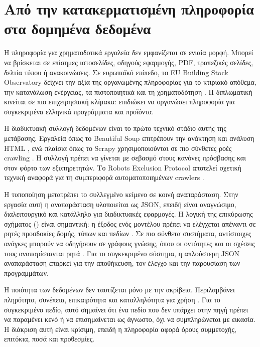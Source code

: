 \section{Από την κατακερματισμένη πληροφορία στα δομημένα δεδομένα}

Η πληροφορία για χρηματοδοτικά εργαλεία δεν εμφανίζεται σε ενιαία μορφή.
Μπορεί να βρίσκεται σε επίσημες ιστοσελίδες, οδηγούς εφαρμογής, PDF,
τραπεζικές σελίδες, δελτία τύπου ή ανακοινώσεις. Σε ευρωπαϊκό επίπεδο, το EU
Building Stock Observatory δείχνει την αξία της οργανωμένης πληροφορίας για
το κτιριακό απόθεμα, την κατανάλωση ενέργειας, τα πιστοποιητικά και τη
χρηματοδότηση \cite{ec_bso_2026}. Η διπλωματική κινείται σε πιο επιχειρησιακή
κλίμακα: επιδιώκει να οργανώσει πληροφορία για συγκεκριμένα ελληνικά
προγράμματα και προϊόντα.

Η διαδικτυακή συλλογή δεδομένων είναι το πρώτο τεχνικό στάδιο αυτής της
μετάβασης. Εργαλεία όπως το Beautiful Soup επιτρέπουν την ανάκτηση και
ανάλυση HTML \cite{beautifulsoup_docs}, ενώ πλαίσια όπως το Scrapy
χρησιμοποιούνται σε πιο σύνθετες ροές crawling \cite{scrapy_docs}. Η συλλογή
πρέπει να γίνεται με σεβασμό στους κανόνες πρόσβασης και στον φόρτο των
εξυπηρετητών. Το Robots Exclusion Protocol αποτελεί σχετική τεχνική αναφορά για
τη συμπεριφορά αυτοματοποιημένων crawlers \cite{rfc9309_robots}.

Η τυποποίηση μετατρέπει το συλλεγμένο κείμενο σε κοινή αναπαράσταση. Στην
εργασία αυτή η αναπαράσταση υλοποιείται ως JSON, επειδή είναι αναγνώσιμο,
διαλειτουργικό και κατάλληλο για διαδικτυακές εφαρμογές. Η λογική της
επικύρωσης σχήματος () είναι σημαντική: η έξοδος ενός
μοντέλου πρέπει να ελέγχεται απέναντι σε ρητές προσδοκίες δομής, τύπων και
πεδίων \cite{json_schema_spec_2026}. Σε πιο
σύνθετα συστήματα, αντίστοιχες ανάγκες μπορούν να οδηγήσουν σε γράφους γνώσης,
όπου οι οντότητες και οι σχέσεις τους αναπαρίστανται ρητά
\cite{hogan2021knowledge}. Για το συγκεκριμένο σύστημα, η απλούστερη JSON
αναπαράσταση επαρκεί για την αποθήκευση, τον έλεγχο και την παρουσίαση των
προγραμμάτων.

Η ποιότητα των δεδομένων δεν ταυτίζεται μόνο με την ακρίβεια. Περιλαμβάνει
πληρότητα, συνέπεια, επικαιρότητα και καταλληλότητα για χρήση
\cite{wang1996dataquality,batini2009dataquality}. Για το συγκεκριμένο πεδίο,
αυτό σημαίνει ότι ένα πεδίο που δεν υπάρχει στην πηγή πρέπει να παραμένει κενό
ή να επισημαίνεται ως άγνωστο, όχι να συμπληρώνεται με εικασία. Η διάκριση αυτή
είναι κρίσιμη, επειδή η πληροφορία αφορά όρους συμμετοχής, επιτόκια, ποσά και
προθεσμίες.

